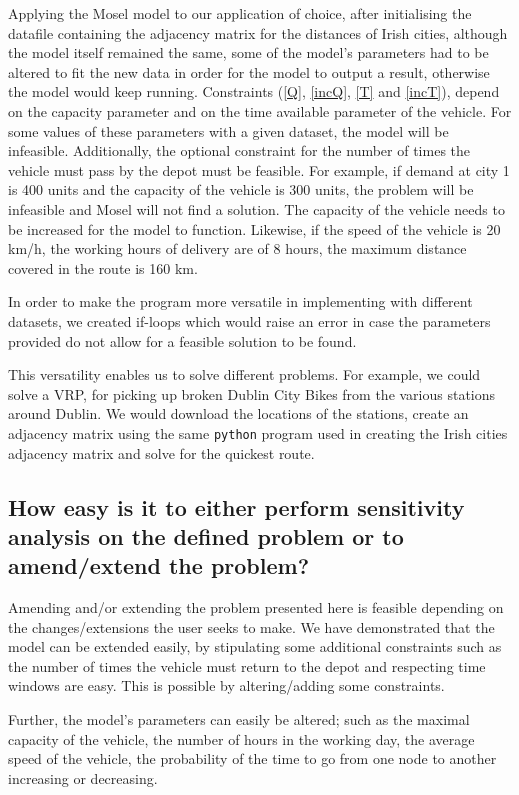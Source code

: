 \documentclass[a4paper,11pt]{article}
\begin{document}
 Applying the Mosel model to our application of choice, after initialising the datafile containing the adjacency matrix for the distances of Irish cities, although the model itself remained the same, some of the model's parameters had to be altered to fit the new data in order for the model to output a result, otherwise the model would keep running. Constraints (\ref{Q}, \ref{incQ}, \ref{T} and \ref{incT}), depend on the capacity parameter and on the time available parameter of the vehicle. For some values of these parameters with a given dataset, the model will be infeasible. Additionally, the optional constraint for the number of times the vehicle must pass by the depot must be feasible. For example, if demand at city 1 is 400 units and the capacity of the vehicle is 300 units, the problem will be infeasible and Mosel will not find a solution. The capacity of the vehicle needs to be increased for the model to function. Likewise, if the speed of the vehicle is 20 km/h, the working hours of delivery are of 8 hours, the maximum distance covered in the route is 160 km.
 
In order to make the program more versatile in implementing with different datasets, we created if-loops which would raise an error in case the parameters provided do not allow for a feasible solution to be found.

This versatility enables us to solve different problems. For example, we could solve a VRP, for picking up broken Dublin City Bikes from the various stations around Dublin. We would download the locations of the stations, create an adjacency matrix using the same \texttt{python} program used in creating the Irish cities adjacency matrix and solve for the quickest route. 

\subsection{How easy is it to either perform sensitivity analysis on the defined problem or to
amend/extend the problem? }

Amending and/or extending the problem presented here is feasible depending on the changes/extensions the user seeks to make. We have demonstrated that the model can be extended easily, by stipulating some additional constraints such as the number of times the vehicle must return to the depot and respecting time windows are easy. This is possible by altering/adding some constraints. 

Further, the model's parameters can easily be altered; such as the maximal capacity of the vehicle, the number of hours in the working day, the average speed of the vehicle, the probability of the time to go from one node to another increasing or decreasing.
\end{document}
